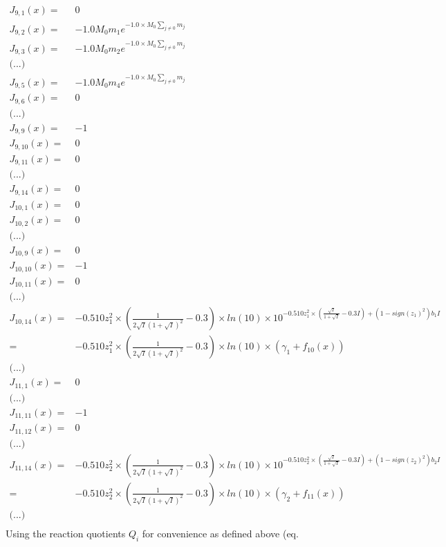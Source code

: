 \documentclass[onecolumn]{article}
\begin{document}
\[
\begin{aligned}
J_{9,1}(x) =&  0\\
J_{9,2}(x) =& -1.0 M_0 m_1 e^{-1.0\times M_0 \sum_{j\neq0}{m_j}}\\
J_{9,3}(x) =& -1.0 M_0 m_2 e^{-1.0\times M_0 \sum_{j\neq0}{m_j}}\\
\text{(...)}\\
J_{9,5}(x) =& -1.0 M_0 m_4 e^{-1.0\times M_0 \sum_{j\neq0}{m_j}}\\
J_{9,6}(x) =& 0\\
\text{(...)}\\
J_{9,9}(x) =& -1\\
J_{9,10}(x) =& 0\\
J_{9,11}(x) =& 0\\
\text{(...)}\\
J_{9,14}(x) =& 0\\
J_{10,1}(x) =& 0\\
J_{10,2}(x) =& 0\\
\text{(...)}\\
J_{10,9}(x) =& 0\\
J_{10,10}(x) =& -1\\
J_{10,11}(x) =& 0\\
\text{(...)}\\
J_{10,14}(x) =&
-0.510 z_1^2\times\left(\frac{1}{2\sqrt{I}(1+\sqrt{I})^2} -0.3\right)
\times ln(10) \times 10^{- 0.510z_1^2 \times
\left(\frac{\sqrt{I}}{1+\sqrt{I}}-0.3I\right) + (1-sign(z_1)^2)b_1 I}\\
=& -0.510 z_1^2\times\left(\frac{1}{2\sqrt{I}(1+\sqrt{I})^2} -0.3\right)
 \times ln(10) \times (\gamma_1+f_{10}(x)) \\
\text{(...)}\\
J_{11,1}(x) =& 0\\
\text{(...)}\\
J_{11,11}(x) =& -1\\
J_{11,12}(x) =& 0\\
\text{(...)}\\
J_{11,14}(x) =&
-0.510 z_2^2\times\left(\frac{1}{2\sqrt{I}(1+\sqrt{I})^2} -0.3\right)
\times ln(10) \times 10^{- 0.510z_2^2 \times
\left(\frac{\sqrt{I}}{1+\sqrt{I}}-0.3I\right) + (1-sign(z_2)^2)b_2 I}\\
=& -0.510 z_2^2\times\left(\frac{1}{2\sqrt{I}(1+\sqrt{I})^2} -0.3\right)
 \times ln(10) \times (\gamma_2+f_{11}(x)) \\
\text{(...)}\\
\end{aligned}
\]
Using the reaction quotients $Q_i$ for convenience as defined above (eq.
\end{document}
